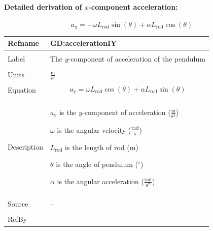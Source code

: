 \documentclass[12pt]{article}
\begin{document}
\paragraph{Detailed derivation of $x$-component acceleration:}
\label{GD:accelerationIXDeriv}
\begin{displaymath}
{a_{\text{x}}}=-ω {L_{\text{rod}}} \sin\left(θ\right)+α {L_{\text{rod}}} \cos\left(θ\right)
\end{displaymath}
\vspace{\baselineskip}
\noindent
\begin{minipage}{\textwidth}
\begin{tabular}{>{\raggedright}p{}>{\raggedright\arraybackslash}p{}}
\toprule \textbf{Refname} & \textbf{GD:accelerationIY}
\label{GD:accelerationIY}
\\ \midrule \\
Label & The $y$-component of acceleration of the pendulum
        
\\ \midrule \\
Units & $\frac{\text{m}}{\text{s}^{2}}$
        
\\ \midrule \\
Equation & \begin{displaymath}
           {a_{\text{y}}}=ω {L_{\text{rod}}} \cos\left(θ\right)+α {L_{\text{rod}}} \sin\left(θ\right)
           \end{displaymath}
\\ \midrule \\
Description & \begin{symbDescription}
              \item{${a_{\text{y}}}$ is the $y$-component of acceleration ($\frac{\text{m}}{\text{s}^{2}}$)}
              \item{$ω$ is the angular velocity ($\frac{\text{rad}}{\text{s}}$)}
              \item{${L_{\text{rod}}}$ is the length of rod (${\text{m}}$)}
              \item{$θ$ is the angle of pendulum (${{}^{\circ}}$)}
              \item{$α$ is the angular acceleration ($\frac{\text{rad}}{\text{s}^{2}}$)}
              \end{symbDescription}
\\ \midrule \\
Source & --
         
\\ \midrule \\
RefBy & 
\\ \bottomrule
\end{tabular}
\end{minipage}
\end{document}
